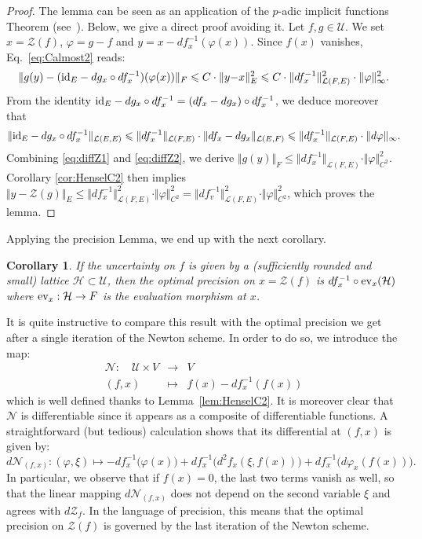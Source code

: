 \documentclass[11pt]{article}
\numberwithin{equation}{section}
\numberwithin{figure}{section}
\renewcommand{\leq}{\leqslant}
\newtheorem{cor}[theo]{Corollary}
\theoremstyle{definition}
\newcommand{\calH}{\mathcal H}
\newcommand{\calL}{\mathcal L}
\newcommand{\calN}{\mathcal N}
\newcommand{\calU}{\mathcal U}
\newcommand{\calZ}{\mathcal Z}
\newcommand{\id}{\text{\rm id}}
\newcommand{\ev}{\text{\rm ev}}
\begin{document}
\begin{proof}
The lemma can be seen as an application of the $p$-adic implicit 
functions Theorem (see~\cite[Proposition~4.3]{Sc11}). Below, we give 
a direct proof avoiding it.
Let $f, g \in \calU$. We set $x = \calZ(f)$, $\varphi = g{-}f$
and $y = x - df_x^{-1}(\varphi(x))$.
Since $f(x)$ vanishes, Eq.~\eqref{eq:Calmost2} reads:
\begin{equation}
\label{eq:diffZ1}
\Vert g(y) - (\id_E - dg_x \circ df_x^{-1})(\varphi(x)) \Vert_F \leq
C \cdot \Vert y{-}x \Vert_E^2 \leq 
C \cdot \Vert df_x^{-1} \Vert_{\calL(F,E)}^2 \cdot \Vert \varphi \Vert_\infty^2.
\end{equation}
From the identity $\id_E - dg_x \circ df_x^{-1} = (df_x - dg_x) \circ 
df_x^{-1}$, we deduce moreover that 
\begin{equation}
\label{eq:diffZ2}
\Vert \id_E - dg_x \circ df_x^{-1}\Vert_{\calL(E,E)} \leq
\Vert df_x^{-1} \Vert_{\calL(F,E)} \cdot 
\Vert df_x - dg_x \Vert_{\calL(E,F)} \leq \Vert df_x^{-1} \Vert_{\calL(F,E)}
\cdot \Vert d \varphi \Vert_\infty.
\end{equation}
Combining \eqref{eq:diffZ1} and \eqref{eq:diffZ2}, we derive
$\Vert g(y) \Vert_F \leq \Vert df_x^{-1} \Vert_{\calL(F,E)}
\cdot \Vert \varphi \Vert_{C^2}^2$. Corollary \ref{cor:HenselC2}
then implies 
$\Vert y - \calZ(g) \Vert_E \leq \Vert df_x^{-1} \Vert_{\calL(F,E)}^2
\cdot \Vert \varphi \Vert_{C^2}^2 =  \Vert df_v^{-1} \Vert_{\calL(F,E)}^2
\cdot \Vert \varphi \Vert_{C^2}^2$, which proves the lemma.
\end{proof}

Applying the precision Lemma, we end up with the next corollary.

\begin{cor}
If the uncertainty on $f$ is given by a (sufficiently rounded and small) 
lattice $\calH \subset \calU$, then the optimal precision on $x = \calZ(f)$ 
is $df_x^{-1} \circ \ev_x(\calH)$ where $\ev_x : \calH \to F$ is the 
evaluation morphism at $x$.
\end{cor}

\noindent
It is quite instructive to compare this result with the optimal
precision we get after a single iteration of the Newton scheme.
In order to do so, we introduce the map:
$$\begin{array}{rcl}
\calN : \quad \calU \times V & \longrightarrow & V \\
(f,x) & \mapsto & f(x) - df_x^{-1}(f(x))
\end{array}$$
which is well defined thanks to Lemma~\ref{lem:HenselC2}. It is moreover 
clear that $\calN$ is differentiable since it appears as a composite of 
differentiable functions.
A straightforward (but tedious) calculation shows that its differential
at $(f,x)$ is given by:
$$d \calN_{(f,x)} : (\varphi, \xi) \mapsto
-df_x^{-1}\big(\varphi(x)\big) + df_x^{-1}\big(d^2 f_x(\xi, f(x))\big)
+ df_x^{-1}\big( d\varphi_x(f(x))\big).$$
In particular, we observe that if $f(x) = 0$, the last two terms
vanish as well, so that the linear mapping $d \calN_{(f,x)}$ does 
not depend on the second variable $\xi$ and agrees with $d \calZ_f$.
In the language of precision, this means that the optimal precision 
on $\calZ(f)$ is governed by the last iteration of the Newton scheme.
\end{document}
